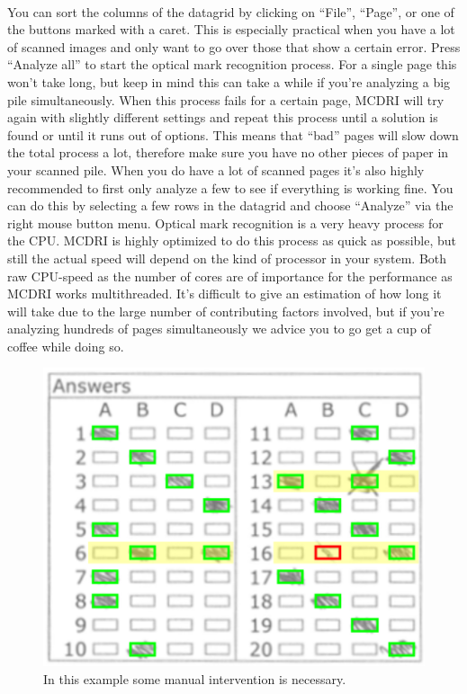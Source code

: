 \documentclass[10pt,a4paper]{article}
\newcommand{\name}{MCDRI }
\begin{document}
\begin{tabular}{l|p{}}
\end{tabular}\\[10pt]

You can sort the columns of the datagrid by clicking on ``File'', ``Page'', or one of the buttons marked with a caret. This is especially practical when you have a lot of scanned images and only want to go over those that show a certain error. Press ``Analyze all'' to start the optical mark recognition process. For a single page this won't take long, but keep in mind this can take a while if you're analyzing a big pile simultaneously. When this process fails for a certain page, \name will try again with slightly different settings and repeat this process until a solution is found or until it runs out of options. This means that ``bad'' pages will slow down the total process a lot, therefore make sure you have no other pieces of paper in your scanned pile. When you do have a lot of scanned pages it's also highly recommended to first only analyze a few to see if everything is working fine. You can do this by selecting a few rows in the datagrid and choose ``Analyze'' via the right mouse button menu. Optical mark recognition is a very heavy process for the CPU. \name is highly optimized to do this process as quick as possible, but still the actual speed will depend on the kind of processor in your system. Both raw CPU-speed as the number of cores are of importance for the performance as \name works multithreaded. It's difficult to give an estimation of how long it will take due to the large number of contributing factors involved, but if you're analyzing hundreds of pages simultaneously we advice you to go get a cup of coffee while doing so. 

\begin{figure}
\centering
\vspace{-10pt}
\includegraphics[scale=.55]{img/impfirst.png}
\caption{In this example some manual intervention is necessary.}
\vspace{-0pt}
\label{fig:manualintervention}
\end{figure}
\end{document}
